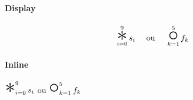 \documentclass{article}
\newcommand{\bigstar}{%
  \mathop{\Huge\mathlarger{\mathlarger{*}}}%
}
\newcommand{\bigcompo}{%
  \mathop{\Huge\mathlarger{\mathlarger{\circ}}}%
}
\begin{document}
\paragraph{Display}

\[ \bigstar_{i = 0}^{9} s_i \quad\text{ ou }\quad \bigcompo_{k = 1}^{5} f_k \]


\paragraph{Inline}

$\bigstar_{i = 0}^{9} s_i$ ou $\bigcompo_{k = 1}^{5} f_k$
\end{document}
